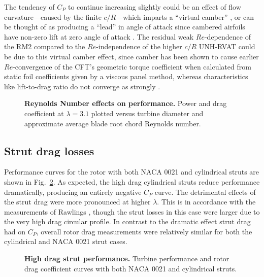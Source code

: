 \documentclass[10pt,letterpaper]{article}
\begin{document}
The tendency of $C_P$ to continue increasing slightly could be an effect of flow
curvature---caused by the finite $c/R$---which imparts a ``virtual camber''
\cite{Migliore1980}, or can be thought of as producing a ``lead'' in angle of
attack since cambered airfoils have non-zero lift at zero angle of attack
\cite{Goude2012}. The residual weak $Re$-dependence of the RM2 compared to the
$Re$-independence of the higher $c/R$ UNH-RVAT could be due to this virtual
camber effect, since camber has been shown to cause earlier $Re$-convergence of
the CFT's geometric torque coefficient when calculated from static foil
coefficients given by a viscous panel method, whereas characteristics like
lift-to-drag ratio do not converge as strongly \cite{Bachant2016-Energies}.

\begin{figure}

    \caption{{\bf Reynolds Number effects on performance.} Power and drag
    coefficient at $\lambda=3.1$ plotted versus turbine diameter and approximate
    average blade root chord Reynolds number.}

    \label{fig:perf-re-dep}
\end{figure}


\subsection*{Strut drag losses}

Performance curves for the rotor with both NACA 0021 and cylindrical struts are
shown in Fig.~\ref{fig:perf-covers}. As expected, the high drag cylindrical
struts reduce performance dramatically, producing an entirely negative $C_P$
curve. The detrimental effects of the strut drag were more pronounced at higher
$\lambda$. This is in accordance with the measurements of Rawlings
\cite{Rawlings2008}, though the strut losses in this case were larger due to the
very high drag circular profile. In contrast to the dramatic effect strut drag
had on $C_P$, overall rotor drag measurements were relatively similar for both
the cylindrical and NACA 0021 strut cases.

\begin{figure}

    \caption{{\bf High drag strut performance.} Turbine performance and rotor
        drag coefficient curves with both NACA 0021 and cylindrical struts.}

    \label{fig:perf-covers}
\end{figure}
\end{document}
